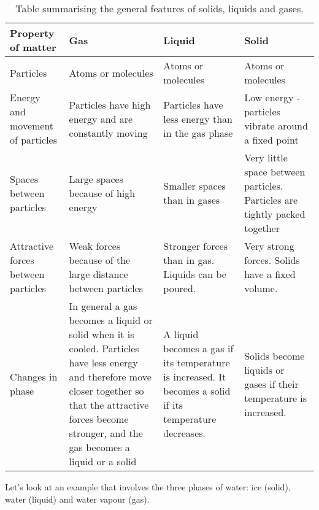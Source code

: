 \begin{table}[h]
\begin{center}
\caption{Table summarising the general features of solids, liquids and gases.}
\label{tab:microscopic:kinetic theory}
\begin{tabular}{|p{3cm}|p{3cm}|p{3cm}|p{3cm}|}\hline
\textbf{Property of matter} & \textbf{Gas} & \textbf{Liquid} & \textbf{Solid} \\\hline
Particles & Atoms or molecules & Atoms or molecules & Atoms or molecules \\\hline
Energy and movement of particles & Particles have high energy and are constantly moving & Particles have less energy than in the gas phase & Low energy - particles vibrate around a fixed point \\\hline
Spaces between particles & Large spaces because of high energy & Smaller spaces than in gases & Very little space between particles. Particles are tightly packed together \\\hline
Attractive forces between particles & Weak forces because of the large distance between particles & Stronger forces than in gas. Liquids can be poured. & Very strong forces. Solids have a fixed volume. \\\hline
Changes in phase & In general a gas becomes a liquid or solid when it is cooled. Particles have less energy and therefore move closer together so that the attractive forces become stronger, and the gas becomes a liquid or a solid & A liquid becomes a gas if its temperature is increased. It becomes a solid if its temperature decreases. & Solids become liquids or gases if their temperature is increased. \\\hline
\end{tabular}
\end{center}
\end{table}

Let's look at an example that involves the three phases of water: ice (solid), water (liquid) and water vapour (gas).\\

